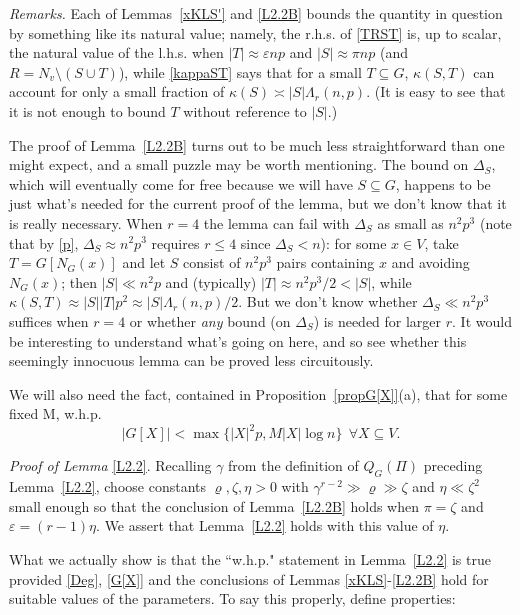 \documentclass[letterpaper,11pt]{article}
\newcommand{\beq}[1]{\begin{equation}\label{#1}}
\newcommand{\enq}[0]{\end{equation}}
\newcommand{\mn}[0]{\medskip\noindent}
\newcommand{\sub}[0]{\subseteq}
\newcommand{\sm}[0]{\setminus}
\newcommand{\0}[0]{\emptyset}
\newcommand{\gc}[0]{\gamma }
\newcommand{\gD}[0]{\Delta }
\newcommand{\gL}[0]{\Lambda}
\newcommand{\gz}[0]{\zeta}
\newcommand{\eps}[0]{\varepsilon }
\newcommand{\vr}[0]{\varrho}
\newcommand{\glr}[0]{\gL_r(n,p)}
\begin{document}
\mn
{\em Remarks.}
Each of Lemmas~\ref{xKLS'} and \ref{L2.2B} bounds
the quantity in question by something like its natural value;
namely, the r.h.s. of \eqref{TRST} is, up to scalar, the
natural value of the l.h.s. when $|T|\approx \eps np$ and
$|S|\approx \pi np$
(and $R= N_v\sm (S\cup T)$),
while
\eqref{kappaST} says that for a small
$T\sub G$, $\kappa(S,T)$ can account for only a small
fraction of $\kappa(S)\asymp|S|\glr$.
(It is easy to see that it is not enough to bound $T$ without
reference to $|S|$.)


The proof of Lemma~\ref{L2.2B} turns out to be much less straightforward than one might expect,
and a small puzzle may  be worth mentioning.
The bound on $\gD_S$, which will eventually come for free
because we will have $S\sub G$, happens to be just
what's needed for the current proof of the lemma,
but we don't know that it is really necessary.
%
When $r=4$ the lemma can fail with $\gD_S$ as small as $n^2p^3$
(note that by \eqref{p}, $\gD_S\approx n^2p^3$ requires $r\leq 4$ since $\gD_S< n$): for some $x\in V$,
take $T=G[N_G(x)]$ and let $S$ consist of $n^2p^3$ pairs
containing $x$ and avoiding $N_G(x)$;
then $|S|\ll n^2p$ and
(typically) $|T| \approx n^2p^3/2 <|S|$, while $\kappa(S,T)\approx |S||T|p^2\approx |S|\glr/2$.
But we don't know whether
$\gD_S\ll n^2p^3$ suffices when $r=4$ or
whether {\em any} bound (on $\gD_S$) is needed for larger $r$.
%
It would be interesting to understand what's going on here,
and so see whether this seemingly innocuous lemma can be proved less circuitously.



\medskip
We will also need the fact, contained in Proposition~\ref{propG[X]}(a),
that for some fixed M, w.h.p.
\beq{G[X]}
|G[X]| < \max\{|X|^2p,M|X|\log n\} ~~\forall X\sub V.
\enq





\mn
{\em Proof of Lemma} \ref{L2.2}.
%
Recalling $\gc$ from the definition of $Q_G(\Pi)$ preceding Lemma~\ref{L2.2},
choose constants $\vr,\gz,\eta>0$ with $\gc^{r-2}\gg \vr\gg\gz$
and $\eta\ll \gz^2$
small enough so that the conclusion
of Lemma~\ref{L2.2B} holds when $\pi =\gz$ and $\eps = (r-1)\eta$.
We assert that Lemma~\ref{L2.2} holds with this value of $\eta$.



\medskip
What we actually show is that the ``w.h.p." statement in
Lemma~\ref{L2.2} is true provided \eqref{Deg},
\eqref{G[X]}
and the conclusions of
Lemmas \ref{xKLS}-\ref{L2.2B} hold for suitable
values of the parameters.
To say this properly, define properties:
\end{document}
